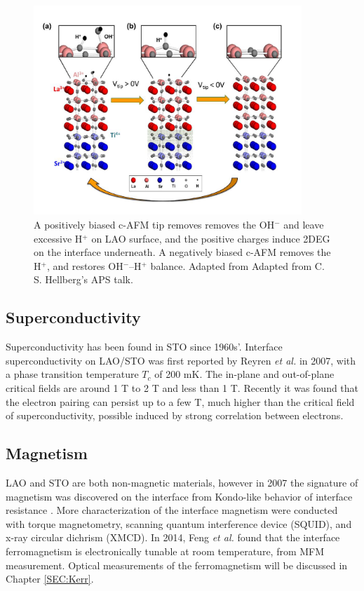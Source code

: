 \documentclass[pdflatex, sectionletters, 12pt]{pittetd}    %
\begin{document}
\begin{figure}[h!]
	\centering
	\includegraphics[width=0.9\textwidth]{Drawing/WaterCycle.png}
	\caption{A positively biased c-AFM tip removes removes the OH$^{-}$ and leave excessive H$^{+}$ on LAO surface, and the positive charges induce 2DEG on the interface underneath. A negatively biased c-AFM removes the H$^{+}$, and restores OH$^{-}$--H$^{+}$ balance. Adapted from Adapted from C. S. Hellberg's APS talk.}
	\label{FIG:WaterCycle}
\end{figure}

\subsection{Superconductivity}

Superconductivity has been found in STO since 1960s'\cite{schooley1964superconductivity}. Interface superconductivity on LAO/STO was first reported by Reyren \textit{et al.} in 2007\cite{reyren2007superconducting}, with a phase transition temperature $T_c$ of 200 mK. The in-plane and out-of-plane critical fields are around 1 T to 2 T and less than 1 T. Recently it was found that the electron pairing can persist up to a few T, much higher than the critical field of superconductivity, possible induced by strong correlation between electrons\cite{cheng2015electron}.

\subsection{Magnetism}

LAO and STO are both non-magnetic materials, however in 2007 the signature of magnetism was discovered on the interface from Kondo-like behavior of interface resistance \cite{brinkman2007magnetic}. More characterization of the interface magnetism were conducted with torque magnetometry\cite{li2011coexistence}, scanning quantum interference device (SQUID)\cite{bert2011direct}, and x-ray circular dichrism (XMCD)\cite{lee2013titanium}. In 2014, Feng \textit{et al.} found that the interface ferromagnetism is electronically tunable at room temperature, from MFM measurement\cite{bi2014room}. Optical measurements of the ferromagnetism will be discussed in Chapter \ref{SEC:Kerr}.
\end{document}
